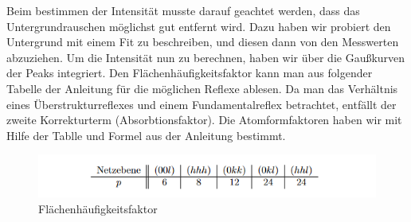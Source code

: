 
                Beim bestimmen der Intensität musste darauf geachtet werden, dass das Untergrundrauschen 
                möglichst gut entfernt wird. Dazu haben wir probiert den Untergrund mit einem 
                Fit zu beschreiben, und diesen dann von den Messwerten abzuziehen. Um die Intensität
                nun zu berechnen, haben wir über die Gaußkurven der Peaks integriert. Den Flächenhäufigkeitsfaktor
                kann man aus folgender Tabelle der Anleitung für die möglichen Reflexe ablesen.
                Da man das Verhältnis eines Überstrukturreflexes und einem Fundamentalreflex betrachtet,
                entfällt der zweite Korrekturterm (Absorbtionsfaktor). Die Atomformfaktoren haben wir 
                mit Hilfe der Tablle und Formel aus der Anleitung bestimmt.

                \begin{figure}
                    \centering
                    \includegraphics{images/flächenhäufigkeitsfaktor.PNG}
                    \caption{Flächenhäufigkeitsfaktor}
                \end{figure}

